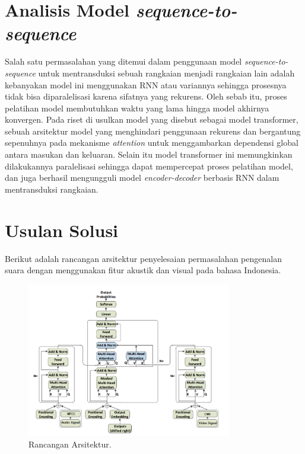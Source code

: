 \section{Analisis Model \textit{sequence-to-sequence}}

Salah satu permasalahan yang ditemui dalam penggunaan model \textit{sequence-to-sequence} untuk mentransduksi sebuah rangkaian menjadi rangkaian lain adalah kebanyakan model ini menggunakan RNN atau variannya sehingga prosesnya tidak bisa diparalelisasi karena sifatnya yang rekurens. Oleh sebab itu, proses pelatihan model membutuhkan waktu yang lama hingga model akhirnya konvergen. Pada riset \textcite{Vaswani2017} di usulkan model yang disebut sebagai model transformer, sebuah arsitektur model yang menghindari penggunaan rekurens dan bergantung sepenuhnya pada mekanisme \textit{attention} untuk menggambarkan dependensi global antara masukan dan keluaran. Selain itu model transformer ini memungkinkan dilakukannya paralelisasi sehingga dapat mempercepat proses pelatihan model, dan juga berhasil mengungguli model \textit{encoder-decoder} berbasis RNN dalam mentransduksi rangkaian.

\section{Usulan Solusi}

Berikut adalah rancangan arsitektur penyelesaian permasalahan pengenalan suara dengan menggunakan fitur akustik dan visual pada bahasa Indonesia.

\begin{figure}[h]
    \centering
    \includegraphics[width=0.8\textwidth]{resources/images/usulan-arsitektur.png}
    \caption{Rancangan Arsitektur.}
    \label{fig:usulan-arsitektur}
\end{figure}

